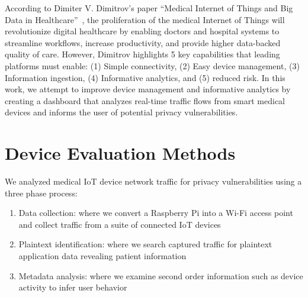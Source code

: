 
According to Dimiter V. Dimitrov's paper ``Medical Internet of Things and Big Data in Healthcare''~\cite{dimitrovIoT},
the proliferation of the medical Internet of Things will revolutionize digital healthcare by enabling doctors and hospital systems to streamline workflows, increase productivity, and provide higher data-backed quality of care. However, Dimitrov highlights 5 key capabilities that leading platforms must enable: (1) Simple connectivity, (2) Easy device management, (3) Information ingestion, (4) Informative analytics, and (5) reduced risk. In this work, we attempt to improve device management and informative analytics by creating a dashboard that analyzes real-time traffic flows from smart medical devices and informs the user of potential privacy vulnerabilities.

\section{Device Evaluation Methods}

We analyzed medical IoT device network traffic for privacy vulnerabilities using a three phase process:

\begin{enumerate}
  \item Data collection: where we convert a Raspberry Pi into a Wi-Fi access point and collect traffic from a suite of connected IoT devices
  \item Plaintext identification: where we search captured traffic for plaintext application data revealing patient information
  \item Metadata analysis: where we examine second order information such as device activity to infer user behavior
\end{enumerate}

